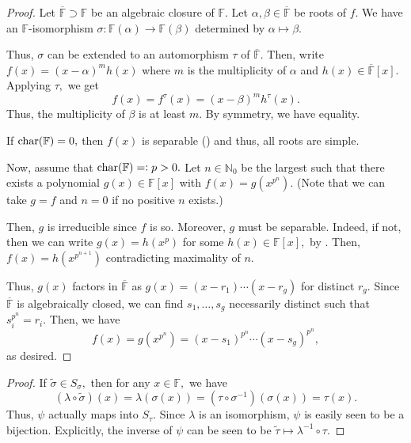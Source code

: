 \samemultirredpoly*\label{prop:samemultirredpoly2}
\begin{flushright}\hyperref[prop:samemultirredpoly]{\upsym}\end{flushright}
\begin{proof}
    Let $\overline{\mathbb{F}} \supset \mathbb{F}$ be an algebraic closure of $\mathbb{F}.$ Let $\alpha, \beta \in \overline{\mathbb{F}}$ be roots of $f.$ We have an $\mathbb{F}$-isomorphism $\sigma : \mathbb{F}(\alpha) \to \mathbb{F}(\beta)$ determined by $\alpha \mapsto \beta.$ 

    Thus, $\sigma$ can be extended to an automorphism $\tau$ of $\overline{\mathbb{F}}.$ Then, write $f(x) = (x - \alpha)^mh(x)$ where $m$ is the multiplicity of $\alpha$ and $h(x) \in \overline{\mathbb{F}}[x].$ Applying $\tau,$ we get
    \begin{equation*} 
        f(x) = f^\tau(x) = (x - \beta)^m h^\tau(x).
    \end{equation*}
    Thus, the multiplicity of $\beta$ is at least $m.$ By symmetry, we have equality.

    If $\operatorname{char}(\mathbb{F}) = 0,$ then $f(x)$ is separable () and thus, all roots are simple.

    Now, assume that $\operatorname{char}(\mathbb{F}) =\vcentcolon p > 0.$ Let $n \in \mathbb{N}_0$ be the largest such that there exists a polynomial $g(x) \in \mathbb{F}[x]$ with $f(x) = g(x^{p^n}).$ (Note that we can take $g = f$ and $n = 0$ if no positive $n$ exists.)

    Then, $g$ is irreducible since $f$ is so. Moreover, $g$ must be separable. Indeed, if not, then we can write $g(x) = h(x^p)$ for some $h(x) \in \mathbb{F}[x],$ by . Then, $f(x) = h(x^{p^{n + 1}})$ contradicting maximality of $n.$

    Thus, $g(x)$ factors in $\overline{\mathbb{F}}$ as $g(x) = (x - r_1) \cdots (x - r_g)$ for distinct $r_g.$ Since $\overline{\mathbb{F}}$ is algebraically closed, we can find $s_1, \ldots, s_g$ necessarily distinct such that $s_i^{p^n} = r_i.$ Then, we have
    \begin{equation*} 
        f(x) = g(x^{p^n}) = (x - s_1)^{p^n} \cdots (x - s_g)^{p^n},
    \end{equation*}
    as desired.
\end{proof}

\separabledegreedef*\label{thm:separabledegreedef2}
\begin{flushright}\hyperref[thm:separabledegreedef]{\upsym}\end{flushright}
\begin{proof}
    If $\widetilde{\sigma} \in S_\sigma,$ then for any $x \in \mathbb{F},$ we have
    \begin{equation*} 
        (\lambda \circ \widetilde{\sigma})(x) = \lambda(\sigma(x)) = (\tau \circ \sigma^{-1})(\sigma(x)) = \tau(x).
    \end{equation*}
    Thus, $\psi$ actually maps into $S_\tau.$ Since $\lambda$ is an isomorphism, $\psi$ is easily seen to be a bijection. Explicitly, the inverse of $\psi$ can be seen to be $\widetilde{\tau} \mapsto \lambda^{-1} \circ \tau.$
\end{proof}

